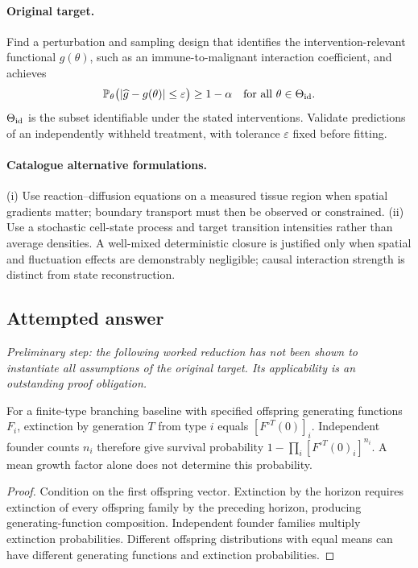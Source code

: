 \documentclass[11pt]{article}
\begin{document}
\paragraph{Original target.}
Find a perturbation and sampling design that identifies the intervention-relevant functional $g(\theta)$, such as an immune-to-malignant interaction coefficient, and achieves
\[
\mathbb{P}_\theta\bigl(|\widehat g-g(\theta)|\leq\varepsilon\bigr)\geq1-\alpha
\quad\text{for all }\theta\in\Theta_{\rm id}.
\]
$\Theta_{\rm id}$ is the subset identifiable under the stated interventions. Validate predictions of an independently withheld treatment, with tolerance $\varepsilon$ fixed before fitting.
\paragraph{Catalogue alternative formulations.}
(i) Use reaction--diffusion equations on a measured tissue region when spatial gradients matter; boundary transport must then be observed or constrained. (ii) Use a stochastic cell-state process and target transition intensities rather than average densities. A well-mixed deterministic closure is justified only when spatial and fluctuation effects are demonstrably negligible; causal interaction strength is distinct from state reconstruction.
\subsection{Attempted answer}
\noindent\emph{Preliminary step: the following worked reduction has not been shown to instantiate all assumptions of the original target. Its applicability is an outstanding proof obligation.}

\begin{proposition}
For a finite-type branching baseline with specified offspring generating functions $F_i$, extinction by generation $T$ from type $i$ equals $[F^{\circ T}(0)]_i$. Independent founder counts $n_i$ therefore give survival probability $1-\prod_i[F^{\circ T}(0)_i]^{n_i}$. A mean growth factor alone does not determine this probability.
\end{proposition}
\begin{proof}
Condition on the first offspring vector. Extinction by the horizon requires extinction of every offspring family by the preceding horizon, producing generating-function composition. Independent founder families multiply extinction probabilities. Different offspring distributions with equal means can have different generating functions and extinction probabilities.
\end{proof}
\end{document}
